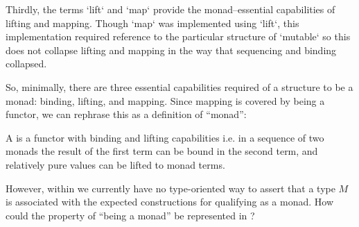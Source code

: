 Thirdly, the terms \code`lift` and \code`map` provide the monad--essential capabilities of lifting and mapping.
Though \code`map` was implemented using \code`lift`, this implementation required reference to the particular structure of \code`mutable` so this does not collapse lifting and mapping in the way that sequencing and binding collapsed.

So, minimally, there are three essential capabilities required of a structure to be a monad: binding, lifting, and mapping.
Since mapping is covered by being a functor, we can rephrase this as a definition of ``monad'':
\begin{blockdefinition}
A  is a functor with binding and lifting capabilities i.e.
in a sequence of two monads the result of the first term can be bound in the second term, and
relatively pure values can be lifted to monad terms.
\end{blockdefinition}

%
%
%

However, within \LangA we currently have no type-oriented way to assert that a type $M$ is associated with the expected constructions for qualifying as a monad.
How could the property of ``being a monad'' be represented in \LangA?

